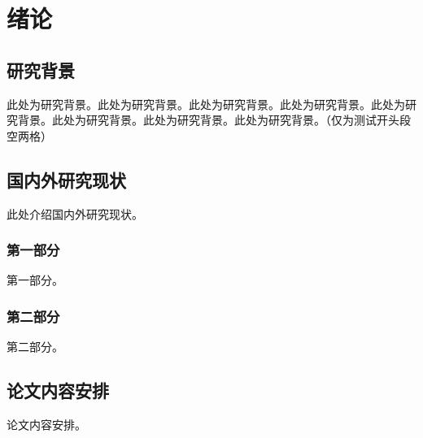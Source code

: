 \setlength{\parindent}{2em}
\chapter{绪论}

\section{研究背景}

此处为研究背景。此处为研究背景。此处为研究背景。此处为研究背景。此处为研究背景。此处为研究背景。此处为研究背景。此处为研究背景。（仅为测试开头段空两格）



\section{国内外研究现状}

此处介绍国内外研究现状。

\subsection{第一部分}

第一部分。 

\subsection{第二部分}

第二部分。

\section{论文内容安排}

论文内容安排。